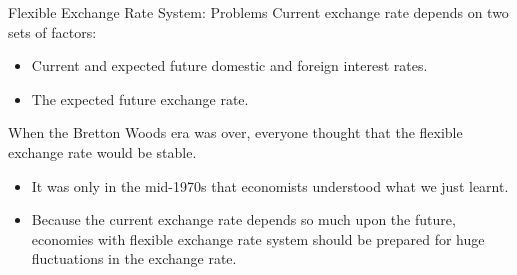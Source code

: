 \documentclass[shownotes,11pt, aspectratio=169]{beamer}
\begin{document}
\begin{frame}{Flexible Exchange Rate System: Problems}
Current exchange rate depends on two sets of factors:
\begin{itemize}
 \item Current and expected future domestic and foreign interest rates.
 \item The expected future exchange rate.
\end{itemize}
\pause
When the Bretton Woods era was over, everyone thought that the flexible exchange rate would be stable.
\begin{itemize}
\item It was only in the mid-1970s that economists understood what we just learnt. 
\item Because the current exchange rate depends so much upon the future, \pause economies with flexible exchange rate system should be prepared for huge fluctuations in the exchange rate.
\end{itemize}
\end{frame}
\end{document}
